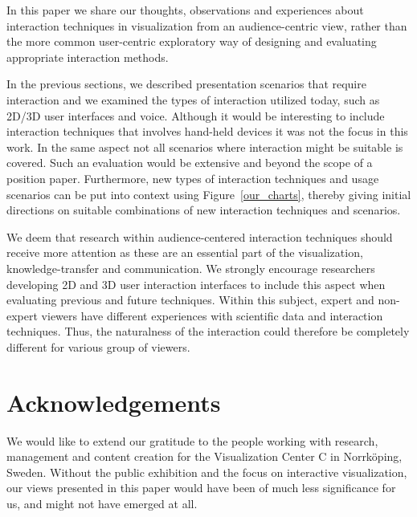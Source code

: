 \documentclass[journal]{vgtc}                %
\begin{document}
In this paper we share our thoughts, observations and experiences about interaction techniques in visualization from an audience-centric view, rather than the more common user-centric exploratory way of designing and evaluating appropriate interaction methods.

In the previous sections, we described presentation scenarios that require interaction and we examined the types of interaction utilized today, such as 2D/3D user interfaces and voice.
Although it would be interesting to include interaction techniques that involves hand-held devices it was not the focus in this work.
In the same aspect not all scenarios where interaction might be suitable is covered.
Such an evaluation would be extensive and beyond the scope of a position paper.
Furthermore, new types of interaction techniques and usage scenarios can be put into context using Figure~\ref{our_charts}, thereby giving initial directions on suitable combinations of new interaction techniques and scenarios.

We deem that research within audience-centered interaction techniques should receive more attention as these are an essential part of the visualization, knowledge-transfer and communication. 
We strongly encourage researchers developing 2D and 3D user interaction interfaces to include this aspect when evaluating previous and future techniques.
Within this subject, expert and non-expert viewers have different experiences with scientific data and interaction techniques. Thus, the naturalness of the interaction could therefore be completely different for various group of viewers.

\section*{Acknowledgements}We would like to extend our gratitude to the people working with research, management and content creation for the Visualization Center C in Norrk\"oping, Sweden. Without the public exhibition and the focus on interactive visualization, our views presented in this paper would have been of much less significance for us, and might not have emerged at all.



\end{document}
